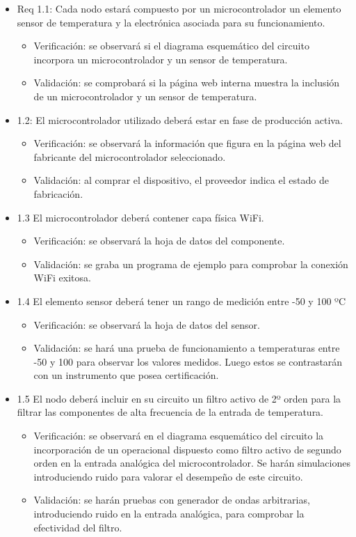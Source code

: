 \documentclass[11pt]{proyecto}
\begin{document}
\begin{itemize} 
\item Req 1.1: Cada nodo estará compuesto por un microcontrolador un elemento sensor de
temperatura y la electrónica asociada para su funcionamiento.
	\begin{itemize}
	\item Verificación: se observará si el diagrama esquemático del circuito incorpora un microcontrolador y un sensor de temperatura.
	\item Validación: se comprobará si la página web interna muestra la inclusión de un microcontrolador y un sensor de temperatura.
\end{itemize}

\item 1.2: El microcontrolador utilizado deberá estar en fase de producción activa.
\begin{itemize}
\item Verificación: se observará la información que figura en la página web del fabricante del microcontrolador seleccionado.
\item Validación: al comprar el dispositivo, el proveedor indica el estado de fabricación.
\end{itemize}

\item 1.3 El microcontrolador deberá contener capa física WiFi.

\begin{itemize}
\item Verificación: se observará la hoja de datos del componente.
\item Validación: se graba un programa de ejemplo para comprobar la conexión WiFi exitosa.
\end{itemize}


\item 1.4 El elemento sensor deberá tener un rango de medición entre -50 y 100 ºC
\begin{itemize}
\item Verificación: se observará la hoja de datos del sensor.
\item Validación: se hará una prueba de funcionamiento a temperaturas entre -50 y 100 para observar los valores medidos. Luego estos se contrastarán con un instrumento que posea certificación.
\end{itemize}


\item 1.5 El nodo deberá incluir en su circuito un filtro activo de 2º orden para la filtrar las componentes de alta frecuencia de la entrada de temperatura.
\begin{itemize}
\item Verificación: se observará en el diagrama esquemático del circuito la incorporación de un operacional dispuesto como filtro activo de segundo orden en la entrada analógica del microcontrolador. Se harán simulaciones introduciendo ruido para valorar el desempeño de este circuito.
\item Validación: se harán pruebas con generador de ondas arbitrarias, introduciendo ruido en la entrada analógica, para comprobar la efectividad del filtro.
\end{itemize}


\end{itemize}
\end{document}
